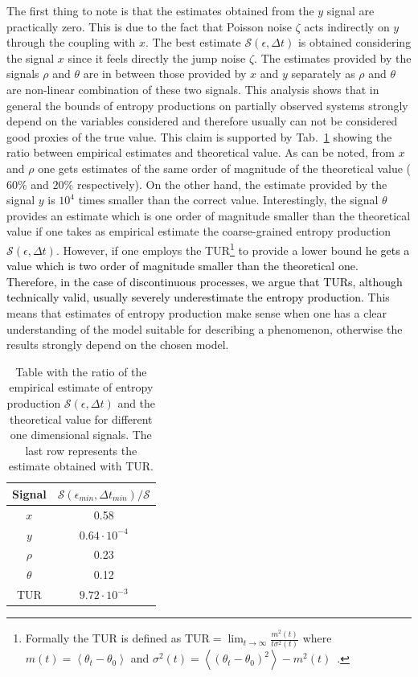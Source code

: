 \documentclass[12pt]{iopart}
\newcommand{\lx} {\left}
\newcommand{\rx} {\right}
\newcommand{\eps} {\epsilon}
\newcommand{\ave}[1] {\lx\langle #1 \rx\rangle}
\newcommand{\cS} {\mathcal{S}}
\begin{document}
The first thing to note is that the estimates obtained from the $y$ signal are practically zero. This is due to the fact that Poisson noise $\zeta$ acts indirectly on $y$ through the coupling with $x$. The best estimate $\cS(\eps, \Delta t)$ is obtained considering the signal $x$ since it feels directly the jump noise $\zeta$. The estimates provided by the signals $\rho$ and $\theta$ are in between those provided by $x$ and $y$ separately as $\rho$ and $\theta$ are non-linear combination of these two signals. This analysis shows that in general the bounds of entropy productions on partially observed systems strongly depend on the variables considered and therefore usually can not be considered good proxies of the true value. This claim is supported by Tab.~\ref{tab:1d_estimates_asymptotics} showing the ratio between empirical estimates and theoretical value. As can be noted, from $x$ and $\rho$ one gets estimates of the same order of magnitude of the theoretical value ($60\%$ and $20\%$ respectively). On the other hand, the estimate provided by the signal $y$ is $10^4$ times smaller than the correct value. Interestingly, the signal $\theta$ provides an estimate which is one order of magnitude smaller than the theoretical value if one takes as empirical estimate the coarse-grained entropy production $\cS(\eps,\Delta t)$. However, if one employs the TUR\footnote{Formally the TUR is defined as $\text{TUR}=\lim_{t\to\infty}\frac{m^2(t)}{t\sigma^2(t)}$ where $m(t)=\ave{\theta_t-\theta_0}$ and $\sigma^2(t)=\ave{(\theta_t-\theta_0)^2}-m^2(t)$~\textcolor{black}{\cite{barato2015thermodynamic,seifert2018stochastic}}.} to provide a lower bound \textcolor{black}{he gets a value which is two order of magnitude smaller than the theoretical one.} \textcolor{black}{Therefore, in the case of discontinuous processes, we argue that TURs, although technically valid, usually severely underestimate the entropy production.} This means that estimates of entropy production make sense when one has a clear understanding of the model suitable for describing a phenomenon, otherwise the results strongly depend on the chosen model.
 
\begin{table}[h]
\centering
\begin{tabular}{|c|c|}
\hline
 Signal & $\cS(\eps_{min},\Delta t_{min})/\cS$  \\
\hline
$x$  & 0.58 \\
$y$  & $0.64\cdot 10^{-4}$  \\
$\rho$ & 0.23\\
$\theta$ & 0.12\\
\hline
TUR & $9.72\cdot 10^{-3}$ \\
\hline
\end{tabular}
\label{tab:1d_estimates_asymptotics}
\caption{Table with the ratio of the empirical estimate of entropy production $\cS(\eps,\Delta t)$ and the theoretical value for different one dimensional signals. The last row represents the estimate obtained with TUR.}
\end{table}
\end{document}
